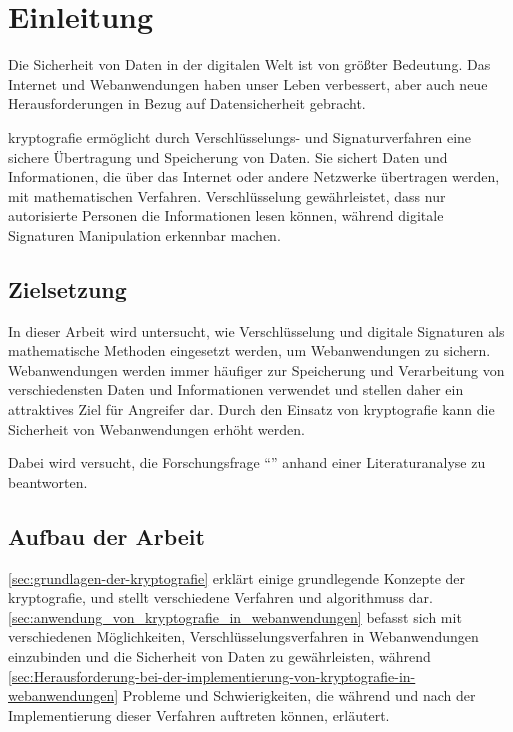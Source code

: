 \section{Einleitung}\label{sec:einleitung}
Die Sicherheit von Daten in der digitalen Welt ist von größter Bedeutung. 
Das Internet und Webanwendungen haben unser Leben verbessert, aber auch neue Herausforderungen in Bezug auf Datensicherheit gebracht.

\Gls{kryptografie} ermöglicht durch Verschlüsselungs- und Signaturverfahren eine sichere Übertragung und Speicherung von Daten.
Sie sichert Daten und Informationen, die über das Internet oder andere Netzwerke übertragen werden, mit mathematischen Verfahren. 
Verschlüsselung gewährleistet, dass nur autorisierte Personen die Informationen lesen können, während digitale Signaturen Manipulation erkennbar machen.


\subsection{Zielsetzung}\label{subsec:zielsetzung}
In dieser Arbeit wird untersucht, wie Verschlüsselung und digitale Signaturen als mathematische Methoden eingesetzt werden, um Webanwendungen zu sichern.
Webanwendungen werden immer häufiger zur Speicherung und Verarbeitung von verschiedensten Daten und Informationen verwendet und stellen daher ein attraktives Ziel für Angreifer dar.
Durch den Einsatz von \gls{kryptografie} kann die Sicherheit von Webanwendungen erhöht werden.

Dabei wird versucht, die Forschungsfrage \enquote{\myForschungsfrage} anhand einer Literaturanalyse zu beantworten.


\subsection{Aufbau der Arbeit}\label{subsec:aufbau-der-arbeit}
 \autoref{sec:grundlagen-der-kryptografie} erklärt einige grundlegende Konzepte der \gls{kryptografie}, und stellt verschiedene  Verfahren und \glspl{algorithmus} dar.
\autoref{sec:anwendung_von_kryptografie_in_webanwendungen} befasst sich mit verschiedenen Möglichkeiten, Verschlüsselungsverfahren in Webanwendungen einzubinden und die Sicherheit von Daten zu gewährleisten, während  \autoref{sec:Herausforderung-bei-der-implementierung-von-kryptografie-in-webanwendungen} Probleme und Schwierigkeiten, die während und nach der Implementierung dieser Verfahren auftreten können, erläutert.